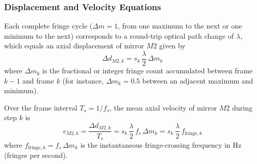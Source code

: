 \subsubsection{Displacement and Velocity Equations}
Each complete fringe cycle ($\Delta m = 1$, from one maximum to the next or one minimum to the next) corresponds to a round-trip optical path change of $\lambda$, which equals an axial displacement of mirror $M2$ given by
\begin{equation}
    \Delta d_{M2, k} = s_k\,\frac{\lambda}{2}\,\Delta m_k
    \label{eq:roi_step_displacement}
\end{equation}
where $\Delta m_k$ is the fractional or integer fringe count accumulated between frame $k-1$ and frame $k$ (for instance, $\Delta m_k = 0.5$ between an adjacent maximum and minimum).

Over the frame interval $T_s = 1/f_s$, the mean axial velocity of mirror $M2$ during step $k$ is
\begin{equation}
    v_{M2, k} = \frac{\Delta d_{M2, k}}{T_s} = s_k\,\frac{\lambda}{2}\,f_s\,\Delta m_k = s_k\,\frac{\lambda}{2}\,f_{\text{fringe}, k}
    \label{eq:roi_step_velocity}
\end{equation}
where $f_{\text{fringe}, k} = f_s\,\Delta m_k$ is the instantaneous fringe-crossing frequency in $\text{Hz}$ (fringes per second).


